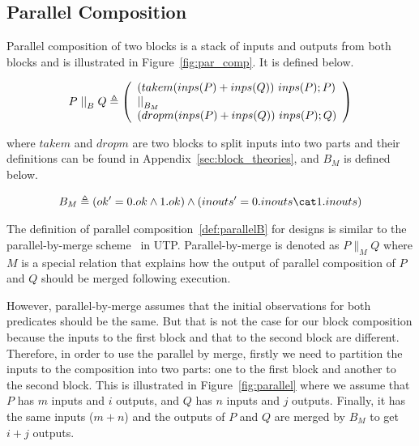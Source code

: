 \subsection{Parallel Composition}
Parallel composition of two blocks is a stack of inputs and outputs from both blocks and is illustrated in Figure~\ref{fig:par_comp}. It is defined below.
\begin{definition} \label{def:parallelB} 
    \begin{align*}
        P \parallel_{B} Q \defs \left(
        \begin{array}[]{l}
            \left(takem (inps(P)+inps(Q))~inps(P) \dcomp P \right) \\
            \parallel_{B_M} \\
            \left(dropm (inps(P)+inps(Q))~inps(P) \dcomp Q \right) 
        \end{array} \right)
    \end{align*}
\end{definition}
where $takem$ and $dropm$ are two blocks to split inputs into two parts and their definitions can be found in Appendix~\ref{sec:block_theories}, and $B_M$ is defined below. 
\begin{definition}[$B_M$] \label{def:mergeB} 
    \begin{align*}
        B_M \defs \left(ok' = 0.ok \land 1.ok\right) \land \left(inouts' = 0.inouts \cat 1.inouts\right) 
    \end{align*}
\end{definition}

The definition of parallel composition~\ref{def:parallelB} for designs is similar to the parallel-by-merge scheme~\cite[Sect.~7.2]{Hoare1998} in UTP. Parallel-by-merge is denoted as $P \parallel_M Q$ where $M$ is a special relation that explains how the output of parallel composition of $P$ and $Q$ should be merged following execution. 

However, parallel-by-merge assumes that the initial observations for both predicates should be the same. But that is not the case for our block composition because the inputs to the first block and that to the second block are different. Therefore, in order to use the parallel by merge, firstly we need to partition the inputs to the composition into two parts: one to the first block and another to the second block. This is illustrated in Figure~\ref{fig:parallel} where we assume that $P$ has $m$ inputs and $i$ outputs, and $Q$ has $n$ inputs and $j$ outputs. Finally, it has the same inputs ($m+n$) and the outputs of $P$ and $Q$ are merged by $B_M$ to get $i+j$ outputs.

